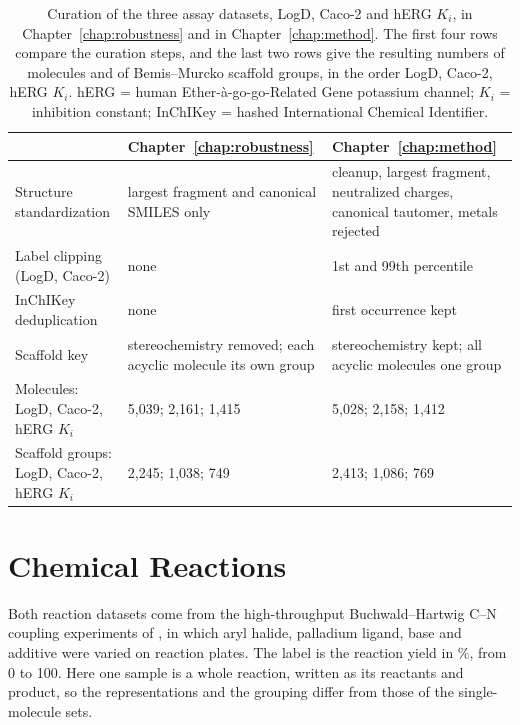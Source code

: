 \begin{table}[htbp]
\centering
\small
\begin{adjustbox}{max width=\textwidth}
\begin{tabular}{P{3.4cm}P{4.8cm}P{4.8cm}}
\toprule
 & Chapter~\ref{chap:robustness} & Chapter~\ref{chap:method} \\
\midrule
Structure standardization & largest fragment and canonical SMILES only & cleanup, largest fragment, neutralized charges, canonical tautomer, metals rejected \\
Label clipping (LogD, Caco-2) & none & 1st and 99th percentile \\
InChIKey deduplication & none & first occurrence kept \\
Scaffold key & stereochemistry removed; each acyclic molecule its own group & stereochemistry kept; all acyclic molecules one group \\
Molecules: LogD, Caco-2, hERG $K_i$ & 5,039; 2,161; 1,415 & 5,028; 2,158; 1,412 \\
Scaffold groups: LogD, Caco-2, hERG $K_i$ & 2,245; 1,038; 749 & 2,413; 1,086; 769 \\
\bottomrule
\end{tabular}
\end{adjustbox}
\caption[Curation of the three assay datasets in two chapters.]{Curation of the three assay datasets, LogD, Caco-2 and hERG $K_i$, in Chapter~\ref{chap:robustness} and in Chapter~\ref{chap:method}. The first four rows compare the curation steps, and the last two rows give the resulting numbers of molecules and of Bemis--Murcko scaffold groups, in the order LogD, Caco-2, hERG $K_i$. hERG = human Ether-\`a-go-go-Related Gene potassium channel; $K_i$ = inhibition constant; InChIKey = hashed International Chemical Identifier.}
\label{tab:curation_ch3_ch5}
\end{table}

\section{Chemical Reactions}\label{app:datasets:reactions}

Both reaction datasets come from the high-throughput Buchwald--Hartwig C--N coupling experiments of \citet{Ahneman2018}, in which aryl halide, palladium ligand, base and additive were varied on reaction plates. The label is the reaction yield in \%, from 0 to 100. Here one sample is a whole reaction, written as its reactants and product, so the representations and the grouping differ from those of the single-molecule sets.

